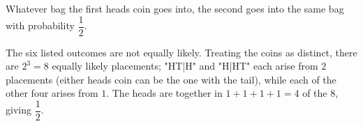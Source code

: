 Whatever bag the first heads coin goes into, the second goes into the same bag with probability $\boxed{\dfrac12}$.

The six listed outcomes are not equally likely. Treating the coins as distinct, there are $2^3=8$ equally likely placements; "HT|H" and "H|HT" each arise from $2$ placements (either heads coin can be the one with the tail), while each of the other four arises from $1$. The heads are together in $1+1+1+1=4$ of the $8$, giving $\dfrac12$.
